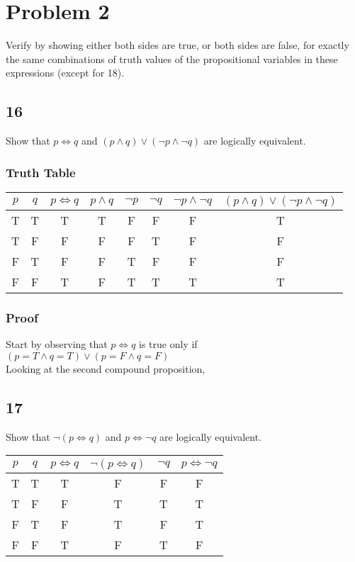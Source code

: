 \documentclass{article}
\begin{document}
\section{Problem 2}

Verify by showing either both sides are true, or both sides are false, for exactly the same combinations of truth values of the propositional variables in these expressions (except for 18).

\subsection{16}

Show that $ p \iff q $ and $ ( p \land q ) \lor ( \neg p \land \neg q ) $ are logically equivalent.

\subsubsection{Truth Table}

\begin{tabular}{ | c | c | c | c | c | c | c | c | }
	$ p $ & $ q $ & $ p \iff q $ & $ p \land q $ & $ \neg p $ & $ \neg q $ & $ \neg p \land \neg q $ & $ ( p \land q ) \lor ( \neg p \land \neg q ) $ \\
	\hline
	T & T & T & T & F & F & F & T \\
	T & F & F & F & F & T & F & F \\
	F & T & F & F & T & F & F & F \\
	F & F & T & F & T & T & T & T
\end{tabular}

\subsubsection{Proof}

Start by observing that $ p \iff q $ is true only if $ ( p = T \land q = T ) \lor ( p = F \land q = F ) $ \\
Looking at the second compound proposition, 

\subsection{17}

Show that $ \neg ( p \iff q ) $ and $ p \iff \neg q $ are logically equivalent.

\begin{tabular}{ | c | c | c | c | c | c | }
	$ p $ & $ q $ & $ p \iff q $ & $ \neg ( p \iff q ) $ & $ \neg q $ & $ p \iff \neg q $ \\
	\hline
	T & T & T & F & F & F \\
	T & F & F & T & T & T \\
	F & T & F & T & F & T \\
	F & F & T & F & T & F
\end{tabular}
\end{document}
